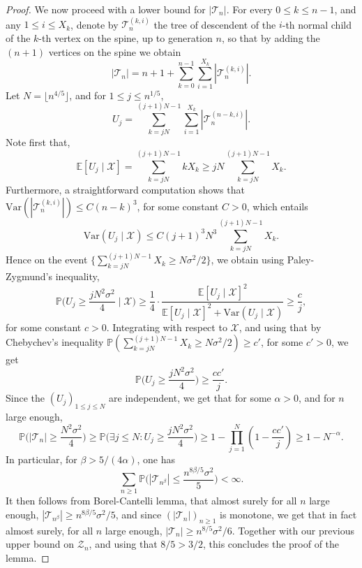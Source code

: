 \documentclass[11pt]{article}
\newcommand{\1}{{\text{\Large $\mathfrak 1$}}}
\begin{document}
\begin{proof}
We now proceed with a lower bound for $|\mathcal T_n|$. For every $0\le k\le n-1$, and any $1\le i\le X_k$, denote by $\mathcal T^{(k,i)}_n$ the tree of descendent of the $i$-th
normal child of the $k$-th vertex on the spine, up to generation $n$, so that by adding the $(n+1)$ vertices on the spine we obtain
$$|\mathcal T_n| =n+1+ \sum_{k=0}^{n-1} \sum_{i=1}^{X_k} |\mathcal T^{(k,i)}_n|. $$ 
Let $N = \lfloor n^{4/5}\rfloor$,  and for $1\le j\le n^{1/5}$,  
$$U_j = \sum_{k = jN}^{(j+1)N - 1}  \sum_{i = 1}^{X_k}  |\mathcal T^{(n-k,i)}_n|. $$ 
Note first that, 
$$\mathbb E[U_j\mid \mathcal X] =  \sum_{k = jN}^{(j+1)N - 1} kX_k\ge jN\sum_{k=jN}^{(j+1)N - 1} X_k.$$
Furthermore, a straightforward computation shows that $\text{Var}(|\mathcal T^{(k,i)}_n|) \le C(n-k)^3$, for some constant $C>0$, which entails 
$$\text{Var}(U_j \mid \mathcal X) \le C(j+1)^3N^3 \sum_{k = jN}^{(j+1)N - 1} X_k. $$  
Hence on the event $\big\{ \sum_{k = jN}^{(j+1)N - 1} X_k \ge N \sigma^2 / 2\big\}$, we obtain using Paley-Zygmund's inequality, 
$$\mathbb P\Big(U_j \ge \frac{jN^2\sigma^2}{4} \mid \mathcal X\Big)  \ge \frac 14 \cdot \frac{ \mathbb E[U_j\mid \mathcal X]^2}{ \mathbb E[U_j\mid \mathcal X]^2 + 
\text{Var}(U_j\mid \mathcal X)} \ge \frac{c}{j}, $$
for some constant $c>0$. Integrating with respect to $\mathcal X$, and using that by Chebychev's inequality $\mathbb P(\sum_{k = jN}^{(j+1)N - 1} X_k \ge N \sigma^2 / 2) \ge c'$, for some $c'>0$, we get 
$$\mathbb P\big(U_j \ge \frac{jN^2\sigma^2}{4}\big)\ge \frac{cc'}{j}. $$ 
Since the $(U_j)_{1\le j\le N}$ are independent, we get that for some $\alpha>0$, and for $n$ large enough, 
$$\mathbb P\big(|\mathcal T_n|\ge \frac{N^2\sigma^2}4\big)\ge  \mathbb P\Big(\exists j\le N : U_j \ge \frac{jN^2\sigma^2}{4}\Big) \ge 1 - \prod_{j=1}^N (1- \frac{cc'}{j}) \ge 1 - N^{-\alpha}. $$ 
In particular, for $\beta>5/(4\alpha)$, one has 
$$\sum_{n\ge 1} \mathbb P\big(|\mathcal T_{n^\beta}| \leq \frac{n^{8\beta/5} \sigma^2}{5}\big)<\infty. $$ 
It then follows from Borel-Cantelli lemma, that almost surely for all $n$ large enough, 
$|\mathcal T_{n^\beta}|\ge n^{8\beta/5} \sigma^2/5$, and since $(|\mathcal T_n|)_{n\ge 1}$ is monotone, we get that in fact almost surely, for all $n$ large enough, 
$|\mathcal T_n|\ge n^{8/5} \sigma^2/6$. Together with our previous upper bound on $\mathcal Z_n$, and using that $8/5 > 3/2$, this concludes the proof of the lemma. 
\end{proof}

\end{document}

